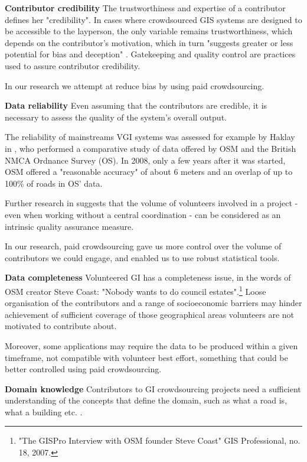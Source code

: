 \textbf{Contributor credibility} The trustworthiness and expertise of a contributor defines her "credibility". In cases where crowdsourced GIS systems are designed to be accessible to the layperson, the only variable remains trustworthiness, which depends on the contributor's motivation, which in turn "suggests greater or less potential for bias and deception" \cite{Flanagin:2008ck}. Gatekeeping and quality control are practices used to assure contributor credibility. 

In our research we attempt at reduce bias by using paid crowdsourcing.

\textbf{Data reliability} Even assuming that the contributors are credible, it is necessary to assess the quality of the system's overall output. 

The reliability of mainstreams VGI systems was assessed for example by Haklay in \cite{Haklay:2010vs}, who performed a comparative study of data offered by OSM and the British NMCA Ordnance Survey (OS). In 2008, only a few years after it was started, OSM offered a "reasonable accuracy" of about 6 meters and an overlap of up to 100\% of roads in OS' data. 

Further research in \cite{Haklay:2010wf} suggests that the volume of volunteers involved in a project - even when working without a central coordination - can be considered as an intrinsic quality assurance measure.

In our research, paid crowdsourcing gave us more control over the volume of contributors we could engage, and enabled us to use robust statistical tools.

\textbf{Data completeness} Volunteered GI has a completeness issue, in the words of OSM creator Steve Coast: "Nobody wants to do council estates".\footnote{"The GISPro Interview with OSM founder Steve Coast" GIS Professional, no. 18, 2007.} Loose organisation of the contributors and a range of socioeconomic barriers \cite{Haklay:2010vs} may hinder achievement of sufficient coverage of those geographical areas volunteers are not motivated to contribute about.

Moreover, some applications may require the data to be produced within a given timeframe, not compatible with volunteer best effort, something that could be better controlled using paid crowdsourcing.

\textbf{Domain knowledge} Contributors to GI crowdsourcing projects need a sufficient understanding of the concepts that define the domain, such as what a road is, what a building etc. \cite{Ballatore:2015kg}. 

